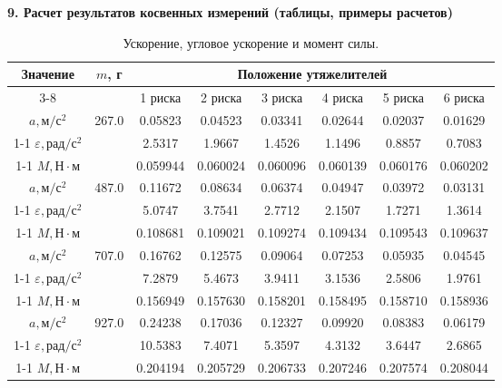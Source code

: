 \documentclass[14pt]{extreport}
\begin{document}
\noindent\textbf{9. Расчет результатов косвенных измерений (таблицы, примеры расчетов)} 

\begin{table}[H]
\centering
\caption{Ускорение, угловое ускорение и момент силы.}
\label{tab:indirect104}
\begin{tabular}{|c|c|c|c|c|c|c|c|}
\hline
\multirow{3}{*}{\textbf{Значение}} & 
\multirow{3}{*}{$m$, г} & 
\multicolumn{6}{c|}{\textbf{Положение утяжелителей}} \\ \cline{3-8}
& & 1 риска & 2 риска & 3 риска & 4 риска & 5 риска & 6 риска \\ \hline
$a, \text{м}/\text{с}^2$ & \multirow{3}{*}{267.0} & 0.05823 & 0.04523 & 0.03341 & 0.02644 & 0.02037 & 0.01629\\ \cline{1-1} \cline{3-8}
$\varepsilon, \text{рад}/\text{с}^2$ & & 2.5317 & 1.9667 & 1.4526 & 1.1496 & 0.8857 & 0.7083\\ \cline{1-1} \cline{3-8}
$M, \text{Н}\cdot\text{м}$ & & 0.059944 & 0.060024 & 0.060096 & 0.060139 & 0.060176 & 0.060202 \\ \hline
$a, \text{м}/\text{с}^2$ & \multirow{3}{*}{487.0} & 0.11672 & 0.08634 & 0.06374 & 0.04947 & 0.03972 & 0.03131\\ \cline{1-1} \cline{3-8}
$\varepsilon, \text{рад}/\text{с}^2$ & & 5.0747 & 3.7541 & 2.7712 & 2.1507 & 1.7271 & 1.3614\\ \cline{1-1} \cline{3-8}
$M, \text{Н}\cdot\text{м}$ & & 0.108681 & 0.109021 & 0.109274 & 0.109434 & 0.109543 & 0.109637 \\ \hline
$a, \text{м}/\text{с}^2$ & \multirow{3}{*}{707.0} & 0.16762 & 0.12575 & 0.09064 & 0.07253 & 0.05935 & 0.04545\\ \cline{1-1} \cline{3-8}
$\varepsilon, \text{рад}/\text{с}^2$ & & 7.2879 & 5.4673 & 3.9411 & 3.1536 & 2.5806 & 1.9761\\ \cline{1-1} \cline{3-8}
$M, \text{Н}\cdot\text{м}$ & & 0.156949 & 0.157630 & 0.158201 & 0.158495 & 0.158710 & 0.158936 \\ \hline
$a, \text{м}/\text{с}^2$ & \multirow{3}{*}{927.0} & 0.24238 & 0.17036 & 0.12327 & 0.09920 & 0.08383 & 0.06179\\ \cline{1-1} \cline{3-8}
$\varepsilon, \text{рад}/\text{с}^2$ & & 10.5383 & 7.4071 & 5.3597 & 4.3132 & 3.6447 & 2.6865\\ \cline{1-1} \cline{3-8}
$M, \text{Н}\cdot\text{м}$ & & 0.204194 & 0.205729 & 0.206733 & 0.207246 & 0.207574 & 0.208044 \\ \hline

\end{tabular}
\end{table}
\end{document}
